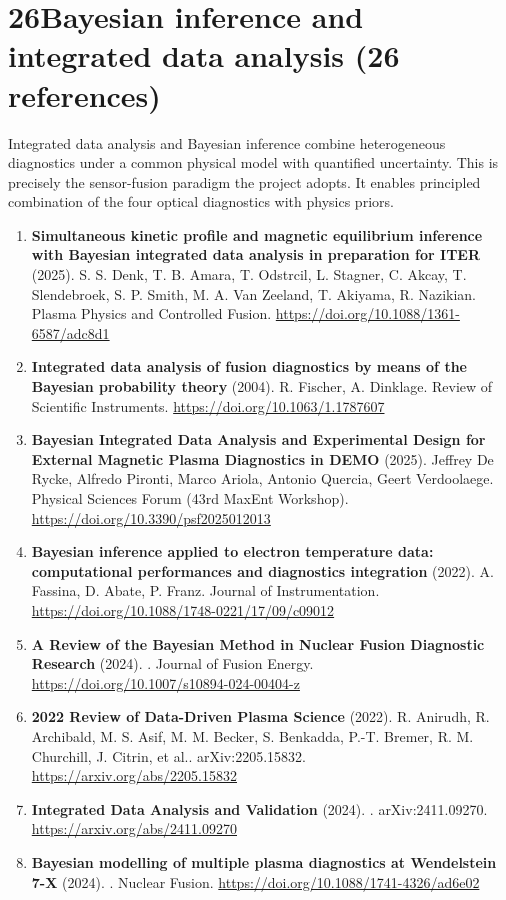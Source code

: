\documentclass[11pt,a4paper]{article}
\begin{document}
\section*{26\quad Bayesian inference and integrated data analysis \textnormal{(\normalsize 26 references)}}
Integrated data analysis and Bayesian inference combine heterogeneous diagnostics under a common physical model with quantified uncertainty. This is precisely the sensor-fusion paradigm the project adopts. It enables principled combination of the four optical diagnostics with physics priors.
\begin{enumerate}[leftmargin=1.4em]
\item \textbf{Simultaneous kinetic profile and magnetic equilibrium inference with Bayesian integrated data analysis in preparation for ITER} (2025). S. S. Denk, T. B. Amara, T. Odstrcil, L. Stagner, C. Akcay, T. Slendebroek, S. P. Smith, M. A. Van Zeeland, T. Akiyama, R. Nazikian. Plasma Physics and Controlled Fusion. \url{https://doi.org/10.1088/1361-6587/adc8d1}
\item \textbf{Integrated data analysis of fusion diagnostics by means of the Bayesian probability theory} (2004). R. Fischer, A. Dinklage. Review of Scientific Instruments. \url{https://doi.org/10.1063/1.1787607}
\item \textbf{Bayesian Integrated Data Analysis and Experimental Design for External Magnetic Plasma Diagnostics in DEMO} (2025). Jeffrey De Rycke, Alfredo Pironti, Marco Ariola, Antonio Quercia, Geert Verdoolaege. Physical Sciences Forum (43rd MaxEnt Workshop). \url{https://doi.org/10.3390/psf2025012013}
\item \textbf{Bayesian inference applied to electron temperature data: computational performances and diagnostics integration} (2022). A. Fassina, D. Abate, P. Franz. Journal of Instrumentation. \url{https://doi.org/10.1088/1748-0221/17/09/c09012}
\item \textbf{A Review of the Bayesian Method in Nuclear Fusion Diagnostic Research} (2024). . Journal of Fusion Energy. \url{https://doi.org/10.1007/s10894-024-00404-z}
\item \textbf{2022 Review of Data-Driven Plasma Science} (2022). R. Anirudh, R. Archibald, M. S. Asif, M. M. Becker, S. Benkadda, P.-T. Bremer, R. M. Churchill, J. Citrin, et al.. arXiv:2205.15832. \url{https://arxiv.org/abs/2205.15832}
\item \textbf{Integrated Data Analysis and Validation} (2024). . arXiv:2411.09270. \url{https://arxiv.org/abs/2411.09270}
\item \textbf{Bayesian modelling of multiple plasma diagnostics at Wendelstein 7-X} (2024). . Nuclear Fusion. \url{https://doi.org/10.1088/1741-4326/ad6e02}

\end{enumerate}
\end{document}

